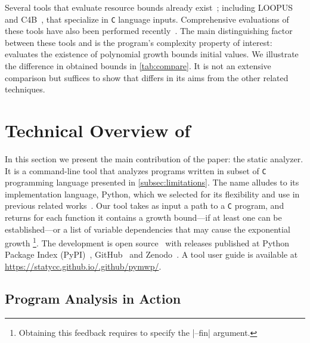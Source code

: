\documentclass[runningheads]{llncs}
\newcommand{\toolURL}{https://statycc.github.io/.github/pymwp/}{}
\begin{document}
Several tools that evaluate resource bounds already exist~\cite{albert2012,alias2010,brockschmidt2016,flores2014,giesl2017,hainry2021,Hoffmann2012c,moser2018}; including LOOPUS~\cite{sinn2017} and C4B~\cite{Carbonneaux2015}, that specialize in \texttt{C} language inputs.
Comprehensive evaluations of these tools have also been performed recently~\cite{Carbonneaux2015,flores2017,sinn2017}.
The main distinguishing factor between these tools and \pymwp is the program's complexity property of interest: \pymwp evaluates the existence of polynomial growth bounds \wrt initial values.
We illustrate the difference in obtained bounds in \autoref{tab:compare}.
It is not an extensive comparison but suffices to show that \pymwp differs in its aims from the other related techniques.



\section{Technical Overview of \pymwp} %
\label{sec:tool}

In this section we present the main contribution of the paper: the \pymwp static analyzer.
It is a command-line tool that analyzes programs written in subset of \texttt{C} programming language presented in \autoref{subsec:limitations}.
The name alludes to its implementation language, Python, which we selected for its flexibility and use in previous related works~\cite{lqicm,Moyen2017,Moyen2017b}.
Our tool takes as input a path to a \texttt{C} program, and returns for each function it contains a growth bound---if at least one can be established---or a list of variable dependencies that may cause the exponential growth %
\footnote{Obtaining this feedback requires to specify the \prc|--fin| argument.}.
The \pymwp development is open source~\cite{pymwp_source} with releases published at Python Package Index (PyPI)~\cite{pymwp_pypi}, GitHub~\cite{pymwp_source} and Zenodo~\cite{pymwp}.
A tool user guide is available at \url{\toolURL}.


\subsection{Program Analysis in Action}  
\label{subsec:action}
\end{document}
